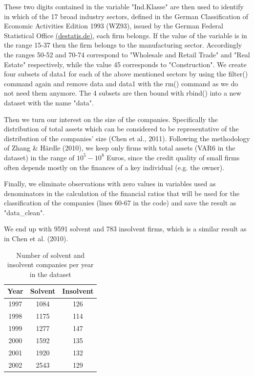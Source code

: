 \documentclass{article}
\begin{document}


These two digits contained in the variable "Ind.Klasse" are then used to identify in which of the 17 broad industry sectors, defined in the German Classification of Economic Activities Edition 1993 (WZ93), issued by the German Federal Statistical Office \href{https://www.destatis.de/DE/Methoden/Klassifikationen/GueterWirtschaftklassifikationen/Content75/KlassifikationWZ93.html}{(destatis.de)}, each firm belongs. If the value of the variable is in the range 15-37 then the firm belongs to the manufacturing sector. Accordingly the ranges 50-52 and 70-74 correspond to "Wholesale and Retail Trade" and "Real Estate" respectively, while the value 45 corresponds to "Construction". We create four subsets of data1 for each of the above mentioned sectors by using the filter() command again and remove data and data1 with the rm() command as we do not need them anymore. The 4 subsets are then bound with rbind() into a new dataset with the name "data". 



Then we turn our interest on the size of the companies. Specifically the distribution of total assets which can be considered to be representative of the distribution of the companies' size (Chen et al., 2011). Following the methodology of Zhang \& H{\"a}rdle (2010), we keep only firms with total assets (VAR6 in the dataset) in the range of $10^5 - 10^8$ Euros, since the credit quality of small firms often depends mostly on the finances of a key individual (e.g. the owner).

Finally, we eliminate observations with zero values in variables used as denominators in the calculation of the financial ratios that will be used for the classification of the companies (lines 60-67 in the code) and save the result as "data\_clean". 



We end up with 9591 solvent and 783 insolvent firms, which is a similar result as in Chen et al. (2010). 

\begin{table}
\caption{Number of solvent and insolvent companies per year in the dataset}
\label{finRatios}
\begin{center}
\begin{tabular}{ccc} 
\hline\hline
Year & Solvent & Insolvent\\ 
\hline
1997 & 1084 & 126 \\
1998 & 1175 & 114 \\
1999 & 1277 & 147 \\
2000 & 1592 & 135 \\
2001 & 1920 & 132 \\
2002 & 2543 & 129 \\
\hline\hline
\end{tabular}
\end{center}
\end{table}
\end{document}
